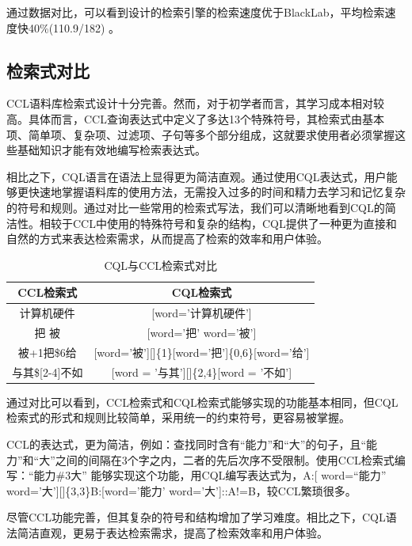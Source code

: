 \documentclass[11pt]{article}
\begin{document}
\begin{CJK*}{UTF8}{gbsn}
通过数据对比，可以看到设计的检索引擎的检索速度优于BlackLab，平均检索速度快40\%(110.9/182) 。

\subsection{检索式对比}

CCL语料库检索式设计十分完善。然而，对于初学者而言，其学习成本相对较高。具体而言，CCL查询表达式中定义了多达13个特殊符号，其检索式由基本项、简单项、复杂项、过滤项、子句等多个部分组成，这就要求使用者必须掌握这些基础知识才能有效地编写检索表达式。

相比之下，CQL语言在语法上显得更为简洁直观。通过使用CQL表达式，用户能够更快速地掌握语料库的使用方法，无需投入过多的时间和精力去学习和记忆复杂的符号和规则。通过对比一些常用的检索式写法，我们可以清晰地看到CQL的简洁性。相较于CCL中使用的特殊符号和复杂的结构，CQL提供了一种更为直接和自然的方式来表达检索需求，从而提高了检索的效率和用户体验。

\begin{table}[h]
	\begin{center}
		\begin{tabular}{c|c}
			\hline \bf CCL检索式 & \bf CQL检索式 \\ \hline
			计算机硬件 & [word='计算机硬件'] \\ \hline
			把 \textbar 被 & [word='把' \textbar word='被'] \\ \hline
			被+1把\$6给 & [word='被'][]\{1\}[word='把']\{0,6\}[word='给'] \\ \hline
			与其\$[2-4]不如 & [word = '与其'][]\{2,4\}[word = '不如'] \\ \hline
		\end{tabular}
	\end{center}
	\caption{\label{ccl-table} CQL与CCL检索式对比}
\end{table}

通过对比可以看到，CCL检索式和CQL检索式能够实现的功能基本相同，但CQL检索式的形式和规则比较简单，采用统一的约束符号，更容易被掌握。

CCL的表达式，更为简洁，例如：查找同时含有“能力”和“大”的句子，且“能力”和“大”之间的间隔在3个字之内，二者的先后次序不受限制。使用CCL检索式编写：“能力\#3大” 能够实现这个功能，用CQL编写表达式为，A:[ word=“能力” \textbar word='大'][]\{3,3\}B:[word='能力' \textbar word='大']::A!=B，较CCL繁琐很多。

尽管CCL功能完善，但其复杂的符号和结构增加了学习难度。相比之下，CQL语法简洁直观，更易于表达检索需求，提高了检索效率和用户体验。


\end{CJK*}
\end{document}
